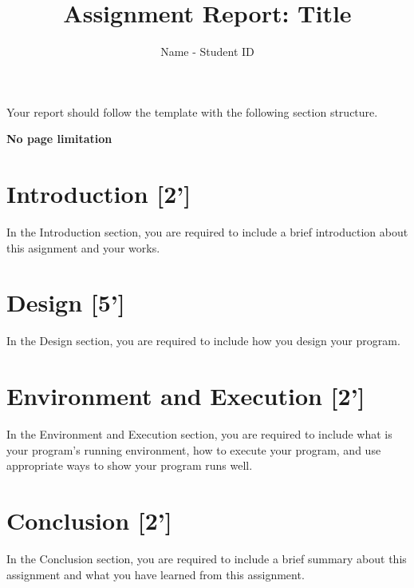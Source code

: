 \documentclass{article}
\title{Assignment Report: Title}
\author{Name - Student ID}
\begin{document}
\maketitle


Your report should follow the template with the following section structure.

\textbf{No page limitation}

\section{Introduction [2']}

In the Introduction section, you are required to include a brief introduction about this asignment and your works.


\section{Design [5']}

In the Design section, you are required to include how you design your program.

\section{Environment and Execution [2']}

In the Environment and Execution section, you are required to include what is your program's running environment, how to execute your program, and use appropriate ways to show your program runs well.

\section{Conclusion [2']}

In the Conclusion section, you are required to include a brief summary about this assignment and what you have learned from this assignment.
\end{document}
